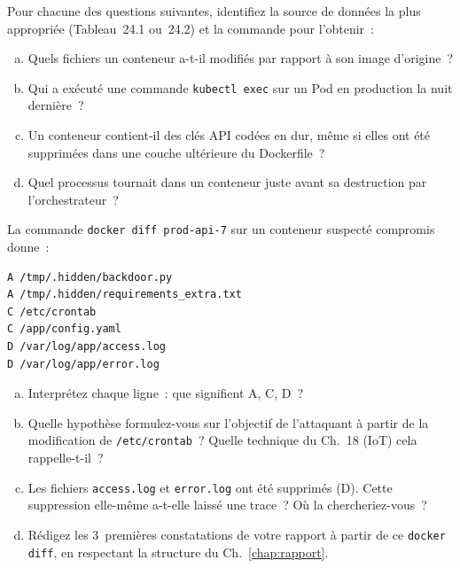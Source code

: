 \begin{boxexo}[title={\ding{45}\quad Exercice~24.1. Identifier les sources \niveaubase}]
Pour chacune des questions suivantes, identifiez la source de
données la plus appropriée (Tableau~24.1 ou~24.2) et la commande
pour l'obtenir~:
\begin{enumerate}[(a)]
    \item Quels fichiers un conteneur a-t-il modifiés par rapport
          à son image d'origine~?
    \item Qui a exécuté une commande \texttt{kubectl exec} sur un
          Pod en production la nuit dernière~?
    \item Un conteneur contient-il des clés API codées en dur,
          même si elles ont été supprimées dans une couche
          ultérieure du Dockerfile~?
    \item Quel processus tournait dans un conteneur juste avant
          sa destruction par l'orchestrateur~?
\end{enumerate}
\end{boxexo}

\begin{boxexo}[title={\ding{45}\quad Exercice~24.2. Analyse de docker diff \niveaumoyen}]
La commande \texttt{docker diff prod-api-7} sur un conteneur
suspecté compromis donne~:
\begin{lstlisting}[language=bash_forensique]
A /tmp/.hidden/backdoor.py
A /tmp/.hidden/requirements_extra.txt
C /etc/crontab
C /app/config.yaml
D /var/log/app/access.log
D /var/log/app/error.log
\end{lstlisting}
\begin{enumerate}[(a)]
    \item Interprétez chaque ligne~: que signifient A, C, D~?
    \item Quelle hypothèse formulez-vous sur l'objectif de
          l'attaquant à partir de la modification de
          \texttt{/etc/crontab}~? Quelle technique du Ch.~18
          (IoT) cela rappelle-t-il~?
    \item Les fichiers \texttt{access.log} et \texttt{error.log}
          ont été supprimés (D). Cette suppression elle-même
          a-t-elle laissé une trace~? Où la chercheriez-vous~?
    \item Rédigez les 3~premières constatations de votre rapport
          à partir de ce \texttt{docker diff}, en respectant
          la structure du Ch.~\ref{chap:rapport}.
\end{enumerate}
\end{boxexo}

